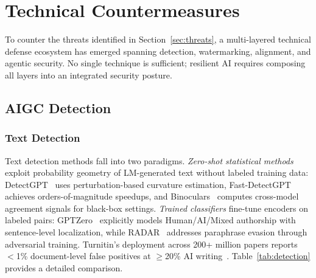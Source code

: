 
\section{Technical Countermeasures}
\label{sec:countermeasures}

To counter the threats identified in Section~\ref{sec:threats}, a multi-layered technical defense ecosystem has emerged spanning detection, watermarking, alignment, and agentic security. No single technique is sufficient; resilient AI requires composing all layers into an integrated security posture.


\subsection{AIGC Detection}
\label{sec:detect}

\subsubsection{Text Detection}
\label{sec:detect-text}

Text detection methods fall into two paradigms. \emph{Zero-shot statistical methods} exploit probability geometry of LM-generated text without labeled training data: DetectGPT~\cite{mitchell2023detectgpt} uses perturbation-based curvature estimation, Fast-DetectGPT~\cite{bao2023fastdetectgpt} achieves orders-of-magnitude speedups, and Binoculars~\cite{hans2024binoculars} computes cross-model agreement signals for black-box settings. \emph{Trained classifiers} fine-tune encoders on labeled pairs: GPTZero~\cite{adam2026gptzero} explicitly models Human/AI/Mixed authorship with sentence-level localization, while RADAR~\cite{hu2023radar} addresses paraphrase evasion through adversarial training. Turnitin's deployment across 200+ million papers reports $<$1\% document-level false positives at $\geq$20\% AI writing~\cite{turnitin2024}. Table~\ref{tab:detection} provides a detailed comparison.

